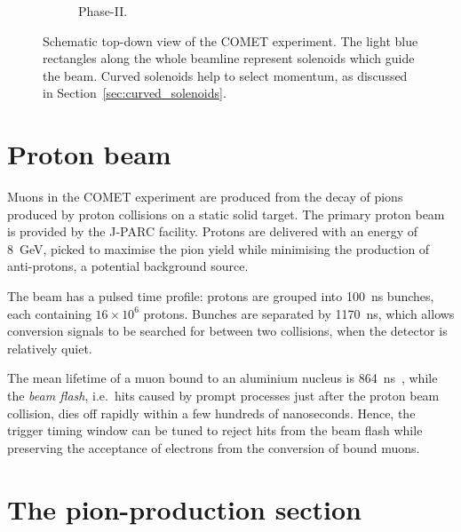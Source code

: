 \begin{figure}
\begin{subfigure}[b]{0.49\textwidth}
        \caption{Phase-II.}
    \end{subfigure}
    \caption{ Schematic top-down view of the COMET experiment. The light blue
        rectangles along the whole beamline represent solenoids which guide the
        beam. Curved solenoids help to select momentum, as discussed in
        Section~\ref{sec:curved_solenoids}.}
    \label{fig:comet_schematic}
\end{figure}


\section{Proton beam}\label{sec:COMET_beam}
Muons in the COMET experiment are produced from the decay of pions produced by
proton collisions on a static solid target. The primary proton beam is provided
by the J-PARC facility. Protons are delivered with an energy of \SI{8}{\GeV},
picked to maximise the pion yield while minimising the production of
anti-protons, a potential background source.

The beam has a pulsed time profile: protons are grouped into \SI{100}{\ns}
bunches, each containing $16\times 10^6$ protons. Bunches are separated by
\SI{1170}{\ns}, which allows conversion signals to be searched for between two
collisions, when the detector is relatively quiet. 

The mean lifetime of a muon bound to an aluminium nucleus is
\SI{864}{\ns}~\cite{PhysRevC.35.2212}, while the \emph{beam flash}, i.e.\ hits
caused by prompt processes just after the proton beam collision, dies off
rapidly within a few hundreds of nanoseconds. Hence, the trigger timing window
can be tuned to reject hits from the beam flash while preserving the acceptance
of electrons from the conversion of bound muons.

\section{The pion-production section}


